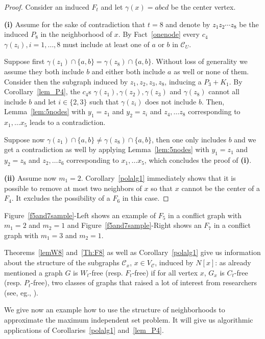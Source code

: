 \documentclass[final]{dmtcs-episciences}
\newcommand\mar[1]{\textcolor{black}{#1}}
\begin{document}
\begin{proof}
Consider an induced $F_t$ and let $\gamma(x)=abcd$ be the center vertex. 
 
 \textbf{(i)} Assume for the sake of contradiction that $t=8$ and
 denote by \mar{$z_1z_2 \cdots z_8$}
be the induced $P_8$ in the neighborhood of $x$.
By Fact~\ref{onenode}
every $c_4$ $\gamma(z_i), i=1, \ldots, 8$ must include at least one of 
$a$ or $b$ in $\mathcal{C}_U$. 

Suppose first $\gamma(z_1)\cap \{a,b\}=\gamma(z_8)\cap \{a,b\}$. Without loss of generality we assume they both include $b$ and either both include $a$ as well or none of them. Consider then the subgraph induced by $z_1,z_2,z_3,z_8$, inducing a $P_3+K_1$.
By Corollary~\ref{lem_P4}, the $c_4$s $\gamma(z_1),\gamma(z_2),\gamma(z_3)$ and $\gamma(z_8)$  cannot all include $b$ and let $i\in\{2,3\}$ such that   $\gamma(z_i)$ does not include $b$. Then, Lemma~\ref{lem:5nodes} with $y_1=z_1$ and $y_2=z_i$ and $z_4, \ldots z_8$ corresponding to $x_1, \ldots x_5$ leads to a contradiction. 

Suppose now $\gamma(z_1)\cap \{a,b\}\neq \gamma(z_8)\cap \{a,b\}$, then one only includes $b$ and we get a contradiction as well by applying Lemma~\ref{lem:5nodes} with $y_1=z_1$ and $y_2=z_8$ and $z_2, \ldots z_6$ corresponding to $x_1, \ldots x_5$, which concludes the proof of \textbf{ (i)}.

\textbf{(ii)}
Assume now $m_1=2$. Corollary~\ref{polalg1} immediately shows that it is possible to remove at most two neighbors of $x$ so that $x$ cannot be the center of a $F_4$. It excludes the possibility of a $F_6$ in this case. 
 \end{proof}

Figure~\ref{f5and7sample}-Left shows an example of $F_5$ in a conflict graph with $m_1=2$ and $m_2=1$ and Figure~\ref{f5and7sample}-Right shows an $F_7$ in a conflict graph with $m_1=3$ and $m_2=1$.
 


Theorems~\ref{lemW8} and~\ref{Th:F8} as well as Corollary~\ref{polalg1}  give us information about the structure of the subgraphs $\mathcal{C}_x$, $x\in V_{\mathcal{C}}$, induced by  $N[x]$: as already mentioned  a graph $G$ is $W_t$-free (resp. $F_t$-free) if for all vertex $x$, $G_x$ is $C_t$-free (resp. $P_t$-free), two classes of graphs that raised a lot of interest from researchers (see, eg., \citet{isgci,graphclassesbook}). 

We give now an example how to use the structure of neighborhoods to approximate the maximum independent set problem. It will give us algorithmic  applications of  Corollaries~\ref{polalg1} and~\ref{lem_P4}. 
\end{document}
